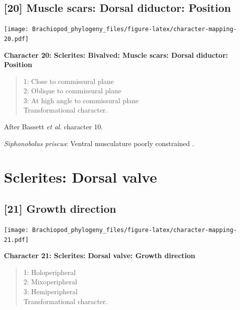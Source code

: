 \documentclass[]{book}
\theoremstyle{definition}
\theoremstyle{definition}
\theoremstyle{definition}
\theoremstyle{remark}
\begin{document}
\hypertarget{muscle-scars-dorsal-diductor-position}{%
\subsection*{{[}20{]} Muscle scars: Dorsal diductor:
Position}\label{muscle-scars-dorsal-diductor-position}}

\texttt{[image: Brachiopod\_phylogeny\_files/figure-latex/character-mapping-20.pdf]}

\textbf{Character 20: Sclerites: Bivalved: Muscle scars: Dorsal
diductor: Position}

\begin{quote}
1: Close to commissural plane\\
2: Oblique to commissural plane\\
3: At high angle to commissural plane\\
Transformational character.
\end{quote}

After Bassett \emph{et al}.
\citeyearpar{Bassett2001Functionalmorphology} character 10.

\emph{Siphonobolus priscus}: Ventral musculature poorly constrained
\citep{Williams2000BrachiopodaLinguliformea, Popov2009Earlyontogeny}.

\hypertarget{sclerites-dorsal-valve}{%
\section{Sclerites: Dorsal valve}\label{sclerites-dorsal-valve}}

\hypertarget{growth-direction}{%
\subsection*{{[}21{]} Growth direction}\label{growth-direction}}

\texttt{[image: Brachiopod\_phylogeny\_files/figure-latex/character-mapping-21.pdf]}

\textbf{Character 21: Sclerites: Dorsal valve: Growth direction}

\begin{quote}
1: Holoperipheral\\
2: Mixoperipheral\\
3: Hemiperipheral\\
Transformational character.
\end{quote}
\end{document}

